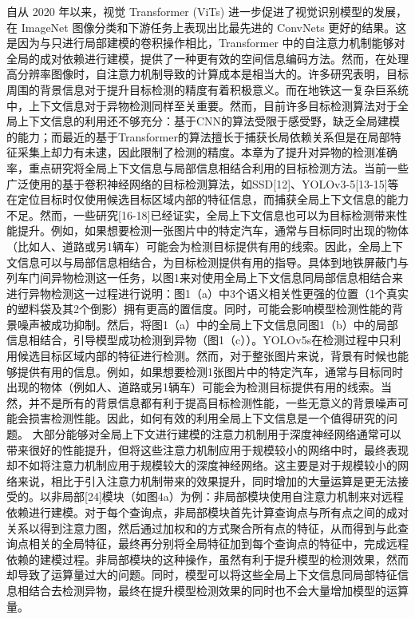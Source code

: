 自从 2020 年以来，视觉 Transformer (ViTs) 进一步促进了视觉识别模型的发展，在 ImageNet 图像分类和下游任务上表现出比最先进的 ConvNets 更好的结果。这是因为与只进行局部建模的卷积操作相比，Transformer 中的自注意力机制能够对全局的成对依赖进行建模，提供了一种更有效的空间信息编码方法。然而，在处理高分辨率图像时，自注意力机制导致的计算成本是相当大的。许多研究表明，目标周围的背景信息对于提升目标检测的精度有着积极意义。而在地铁这一复杂巨系统中，上下文信息对于异物检测同样至关重要。然而，目前许多目标检测算法对于全局上下文信息的利用还不够充分：基于CNN的算法受限于感受野，缺乏全局建模的能力；而最近的基于Transformer的算法擅长于捕获长局依赖关系但是在局部特征采集上却力有未逮，因此限制了检测的精度。本章为了提升对异物的检测准确率，重点研究将全局上下文信息与局部信息相结合利用的目标检测方法。当前一些广泛使用的基于卷积神经网络的目标检测算法，如SSD[12]、YOLOv3-5[13-15]等在定位目标时仅使用候选目标区域内部的特征信息，而捕获全局上下文信息的能力不足。然而，一些研究[16-18]已经证实，全局上下文信息也可以为目标检测带来性能提升。例如，如果想要检测一张图片中的特定汽车，通常与目标同时出现的物体（比如人、道路或另1辆车）可能会为检测目标提供有用的线索。因此，全局上下文信息可以与局部信息相结合，为目标检测提供有用的指导。具体到地铁屏蔽门与列车门间异物检测这一任务，以图1来对使用全局上下文信息同局部信息相结合来进行异物检测这一过程进行说明：图1（a）中3个语义相关性更强的位置（1个真实的塑料袋及其2个倒影）拥有更高的置信度。同时，可能会影响模型检测性能的背景噪声被成功抑制。然后，将图1（a）中的全局上下文信息同图1（b）中的局部信息相结合，引导模型成功检测到异物（图1（c））。YOLOv5s在检测过程中只利用候选目标区域内部的特征进行检测。然而，对于整张图片来说，背景有时候也能够提供有用的信息。例如，如果想要检测1张图片中的特定汽车，通常与目标同时出现的物体（例如人、道路或另1辆车）可能会为检测目标提供有用的线索。当然，并不是所有的背景信息都有利于提高目标检测性能，一些无意义的背景噪声可能会损害检测性能。因此，如何有效的利用全局上下文信息是一个值得研究的问题。
大部分能够对全局上下文进行建模的注意力机制用于深度神经网络通常可以带来很好的性能提升，但将这些注意力机制应用于规模较小的网络中时，最终表现却不如将注意力机制应用于规模较大的深度神经网络。这主要是对于规模较小的网络来说，相比于引入注意力机制带来的效果提升，同时增加的大量运算是更无法接受的。以非局部[24]模块（如图4a）为例：非局部模块使用自注意力机制来对远程依赖进行建模。对于每个查询点，非局部模块首先计算查询点与所有点之间的成对关系以得到注意力图，然后通过加权和的方式聚合所有点的特征，从而得到与此查询点相关的全局特征，最终再分别将全局特征加到每个查询点的特征中，完成远程依赖的建模过程。非局部模块的这种操作，虽然有利于提升模型的检测效果，然而却导致了运算量过大的问题。同时，模型可以将这些全局上下文信息同局部特征信息相结合去检测异物，最终在提升模型检测效果的同时也不会大量增加模型的运算量。


